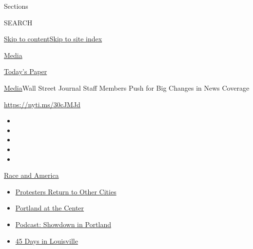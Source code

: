 Sections

SEARCH

\protect\hyperlink{site-content}{Skip to
content}\protect\hyperlink{site-index}{Skip to site index}

\href{https://www.nytimes3xbfgragh.onion/section/business/media}{Media}

\href{https://myaccount.nytimes3xbfgragh.onion/auth/login?response_type=cookie\&client_id=vi}{}

\href{https://www.nytimes3xbfgragh.onion/section/todayspaper}{Today's
Paper}

\href{/section/business/media}{Media}\textbar{}Wall Street Journal Staff
Members Push for Big Changes in News Coverage

\url{https://nyti.ms/30cJMJd}

\begin{itemize}
\item
\item
\item
\item
\item
\end{itemize}

\href{https://www.nytimes3xbfgragh.onion/news-event/george-floyd-protests-minneapolis-new-york-los-angeles?action=click\&pgtype=Article\&state=default\&region=TOP_BANNER\&context=storylines_menu}{Race
and America}

\begin{itemize}
\tightlist
\item
  \href{https://www.nytimes3xbfgragh.onion/2020/07/26/us/protests-portland-seattle-trump.html?action=click\&pgtype=Article\&state=default\&region=TOP_BANNER\&context=storylines_menu}{Protesters
  Return to Other Cities}
\item
  \href{https://www.nytimes3xbfgragh.onion/2020/07/24/us/portland-oregon-protests-white-race.html?action=click\&pgtype=Article\&state=default\&region=TOP_BANNER\&context=storylines_menu}{Portland
  at the Center}
\item
  \href{https://www.nytimes3xbfgragh.onion/2020/07/23/podcasts/the-daily/portland-protests.html?action=click\&pgtype=Article\&state=default\&region=TOP_BANNER\&context=storylines_menu}{Podcast:
  Showdown in Portland}
\item
  \href{https://www.nytimes3xbfgragh.onion/interactive/2020/07/16/us/black-lives-matter-protests-louisville-breonna-taylor.html?action=click\&pgtype=Article\&state=default\&region=TOP_BANNER\&context=storylines_menu}{45
  Days in Louisville}
\end{itemize}

